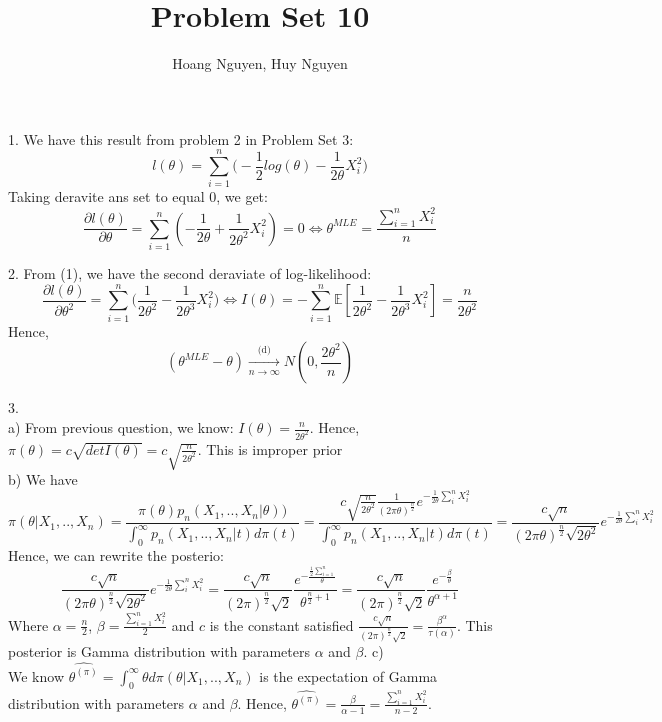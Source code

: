 \documentclass[10pt]{article}
\newenvironment{problem}[2][Problem]{\begin{trivlist}
\item[\hskip \labelsep {\bfseries #1}\hskip \labelsep {\bfseries #2.}]}{\end{trivlist}}
\begin{document}
\title{Problem Set 10}
\author{Hoang Nguyen, Huy Nguyen}
\maketitle
    
\begin{problem}{1}
\item 1.
We have this result from problem 2 in Problem Set 3: 
\[ l(\theta) = \sum_{i=1}^{n} \Big ( -\frac{1}{2} log(\theta) -\frac{1}{2\theta} X_i^2\Big ) \]
Taking deravite ans set to equal 0, we get:
\[\frac{\partial l(\theta)}{\partial\theta} = \sum_{i=1}^{n}(-\frac{1}{2\theta} + \frac{1}{2\theta^2} X_i^2)=0 \Longleftrightarrow \theta^{MLE} = \frac{\sum_{i=1}^{n} X_i^2}{n} \tag{1}\]




\item 2. 
From (1), we have the second deraviate of log-likelihood:
\[\frac{\partial l(\theta)}{\partial \theta^2} =\sum_{i=1}^{n} \Big ( \frac{1}{2\theta^2} - \frac{1}{2\theta^3}X_i^2 \Big ) \Leftrightarrow I(\theta) = -\sum_{i=1}^{n}\mathbb{E}[\frac{1}{2\theta^2} - \frac{1}{2\theta^3}X_i^2]= \frac{n}{2\theta^2}\]
Hence,
\[(\theta^{MLE} - \theta)  \xrightarrow[n \rightarrow \infty]{\text{(d)}} N(0, \frac{2\theta^2}{n})  \]




\item 3.\\ 
a) From previous question, we know: $I(\theta) = \frac{n}{2\theta^2}$. Hence, $\pi(\theta) = c\sqrt{det I(\theta)} = c\sqrt{\frac{n}{2\theta^2}}$. This is improper prior\\
b) We have 
\[ \pi(\theta| X_1,..,X_n) = \frac{\pi(\theta) p_n(X_1,..,X_n|\theta))}{\int_{0}^{\infty} p_n(X_1,..,X_n|t)d\pi(t)} = \frac{c\sqrt{\frac{n}{2\theta^2}} \frac{1}{(2\pi\theta)^{\frac{n}{2}}} e^{-\frac{1}{2\theta} \sum_{i}^{n} X_i^2}}{\int_{0}^{\infty} p_n(X_1,..,X_n|t)d\pi(t)} = \frac{c\sqrt{n}}{(2\pi\theta)^{\frac{n}{2}} \sqrt{2\theta^2}} e^{-\frac{1}{2\theta} \sum_{i}^{n} X_i^2}\]
Hence, we can rewrite the posterio:
\[\frac{c\sqrt{n}}{(2\pi\theta)^{\frac{n}{2}} \sqrt{2\theta^2}} e^{-\frac{1}{2\theta} \sum_{i}^{n} X_i^2} = \frac{c\sqrt{n}}{(2\pi)^{\frac{n}{2}} \sqrt{2}} \frac{e^{-\frac{\frac{1}{2} \sum_{i=1}^{n}}{\theta}}}{\theta^{\frac{n}{2} +1}} = \frac{c\sqrt{n}}{(2\pi)^{\frac{n}{2}} \sqrt{2}} \frac{e^{-\frac{\beta}{\theta}}}{\theta^{\alpha+1}} \]
Where $\alpha = \frac{n}{2}$, $\beta = \frac{\sum_{i=1}^{n} X_i^2}{2}$ and $c$ is the constant satisfied $\frac{c\sqrt{n}}{(2\pi)^{\frac{n}{2}} \sqrt{2}} = \frac{\beta^{\alpha}}{\tau(\alpha)}$. This posterior is Gamma distribution with parameters $\alpha$ and $\beta$.
c)\\
We know $\hat{\theta^{(\pi)}}= \int_{0}^{\infty} \theta d \pi(\theta| X_1,..,X_n)$ is the expectation of Gamma distribution with parameters $\alpha$ and $\beta$. Hence, $\hat{\theta^{(\pi)}} = \frac{\beta}{\alpha - 1} = \frac{\sum_{i=1}^{n} X_i^2}{n -2}$.


\end{problem}

\begin{problem}{2}


\end{problem}
\begin{problem}{3}


\end{problem}
\end{document}
